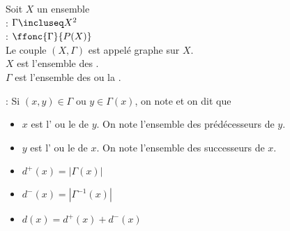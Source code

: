 Soit $X$ un ensemble \\
 : $\Gamma \incluseq X^2$\\
 : $\ffonc{\Gamma}{P(X)}$\\
Le couple $(X,\Gamma)$ est appelé graphe sur $X$.\\
$X$ est l'ensemble des .\\
$\Gamma$ est l'ensemble des  ou la .\\

\vskip 0.6cm

 :
Si $(x,y)\in\Gamma$ ou $y\in\Gamma(x)$, on note   et on dit que 
\begin{itemize}
	\item $x$ est l' ou le  de $y$. On note  l'ensemble des prédécesseurs de $y$.
	\item $y$ est l' ou le  de $x$. On note  l'ensemble des successeurs de $x$.
\end{itemize}

\vskip 0.8cm

\begin{itemize}
	\item $d^+(x)=|\Gamma(x)|$ 
	\item $d^-(x)=|\Gamma^{-1}(x)|$ 
	\item $d(x)=d^+(x)+d^-(x)$ 
\end{itemize}
